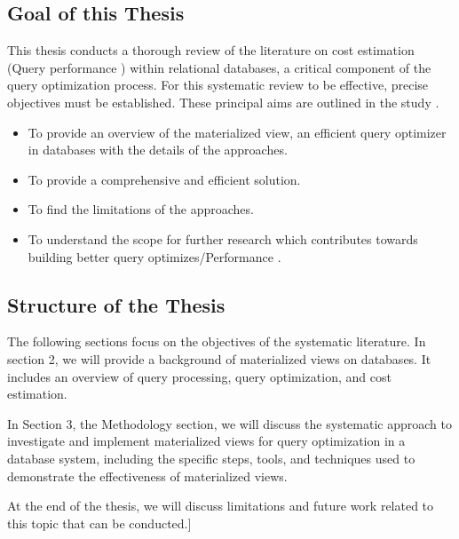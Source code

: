 \subsection{Goal of this Thesis}
\normalsize
This thesis conducts a thorough review of the literature on cost estimation (Query performance ) within relational databases, a critical component of the query optimization process. For this systematic review to be effective, precise objectives must be established. These principal aims are outlined in the study \cite{CostEstimation}.
\begin{itemize}
  \item To provide an overview of the materialized view, an efficient query optimizer in databases with the details of the approaches.
  \item To provide a comprehensive and efficient solution.
  \item To find the limitations of the approaches.
  \item To understand the scope for further research which contributes towards building
better query optimizes/Performance \cite{CostEstimation}.
\end{itemize}
\subsection{Structure of the Thesis }
The following sections focus on the objectives of the systematic literature. In section 2, we will provide a background of materialized views on databases. It includes an overview of query processing, query optimization, and cost estimation.\vspace{.4cm}

In Section 3, the Methodology section, we will discuss the systematic approach to investigate and implement materialized views for query optimization in a database system, including the specific steps, tools, and techniques used to demonstrate the effectiveness of materialized views.\vspace{.4cm}

At the end of the thesis, we will discuss limitations and future work related to this topic that can be conducted.]











